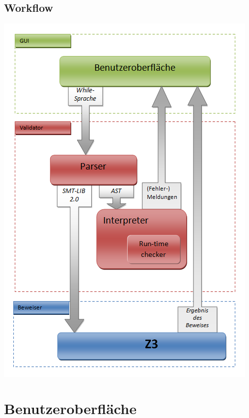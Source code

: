 \documentclass[a4paper,10pt]{article}
\begin{document}
\subsection{Workflow}
\includegraphics[width=\textwidth]{images/process.png}

\section{Benutzeroberfl\"{a}che}
\end{document}

